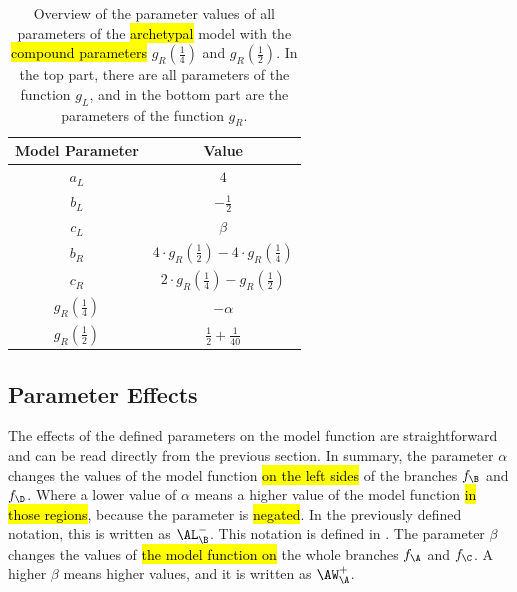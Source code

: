 \begin{table}
	\centering
	\begin{tabular}{|c|c|}
		\hline
		Model Parameter               & Value                                                                       \\ \hline \hline
		$a_L$                         & $4$                                                                         \\ \hline
		$b_L$                         & $-\frac{1}{2}$                                                              \\ \hline
		$c_L$                         & $\beta$                                                                     \\ \hline \hline
		$b_R$                         & $4 \cdot g_R\left(\frac{1}{2}\right) - 4 \cdot g_R\left(\frac{1}{4}\right)$ \\ \hline
		$c_R$                         & $2 \cdot g_R\left(\frac{1}{4}\right) - g_R\left(\frac{1}{2}\right)$         \\ \hline
		$g_R\left(\frac{1}{4}\right)$ & $-\alpha$                                                                   \\ \hline
		$g_R\left(\frac{1}{2}\right)$ & $\frac{1}{2} + \frac{1}{40}$                                                \\ \hline
	\end{tabular}
	\caption[Overview of parameters of the archetypal model]{
		Overview of the parameter values of all parameters of the \hl{archetypal} model with the \hl{compound parameters} $g_R\left(\frac{1}{4}\right)$ and $g_R\left(\frac{1}{2}\right)$.
		In the top part, there are all parameters of the function $g_L$, and in the bottom part are the parameters of the function $g_R$.
	}
	\label{table:setup.arch.parameters}
\end{table}

\subsection{Parameter Effects}
\label{sec:setup.arch.parameterfx}

The effects of the defined parameters on the model function are straightforward and can be read directly from the previous section.
In summary, the parameter $\alpha$ changes the values of the model function \hl{on the left sides} of the branches $f_\B$ and $f_\D$.
Where a lower value of $\alpha$ means a higher value of the model function \hl{in those regions}, because the parameter is \hl{negated}.
In the previously defined notation, this is written as $\AL_{\B}^-$.
This notation is defined in .
The parameter $\beta$ changes the values of \hl{the model function on} the whole branches $f_\A$ and $f_\C$.
A higher $\beta$ means higher values, and it is written as $\AW_{\A}^+$.

